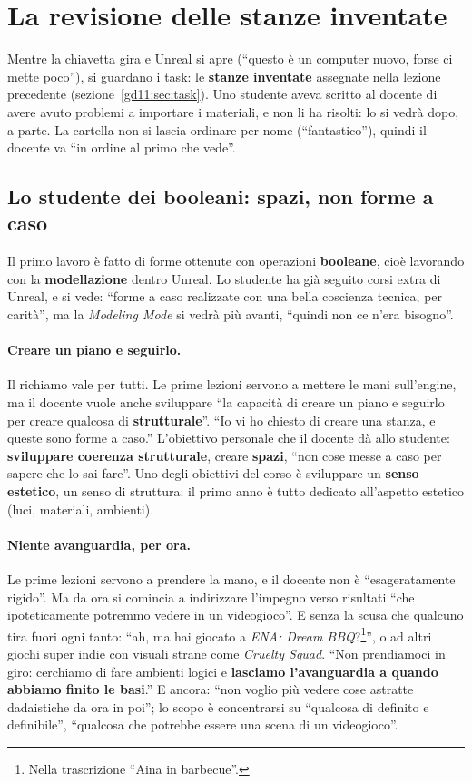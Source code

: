 \section{La revisione delle stanze inventate}
\label{gd14:sec:revisione}

Mentre la chiavetta gira e Unreal si apre (``questo è un computer nuovo, forse ci
mette poco''), si guardano i task: le \textbf{stanze inventate} assegnate nella
lezione precedente (sezione~\ref{gd11:sec:task}). Uno studente aveva scritto al
docente di avere avuto problemi a importare i materiali, e non li ha risolti: lo
si vedrà dopo, a parte. La cartella non si lascia ordinare per nome (``fantastico''),
quindi il docente va ``in ordine al primo che vede''.

\subsection{Lo studente dei booleani: spazi, non forme a caso}

Il primo lavoro è fatto di forme ottenute con operazioni \textbf{booleane}, cioè
lavorando con la \textbf{modellazione} dentro Unreal. Lo studente ha già seguito
corsi extra di Unreal, e si vede: ``forme a caso realizzate con una bella
coscienza tecnica, per carità'', ma la \emph{Modeling Mode} si vedrà più avanti,
``quindi non ce n'era bisogno''.

\paragraph{Creare un piano e seguirlo.} Il richiamo vale per tutti. Le prime
lezioni servono a mettere le mani sull'engine, ma il docente vuole anche
sviluppare ``la capacità di creare un piano e seguirlo per creare qualcosa di
\textbf{strutturale}''. ``Io vi ho chiesto di creare una stanza, e queste sono
forme a caso.'' L'obiettivo personale che il docente dà allo studente:
\textbf{sviluppare coerenza strutturale}, creare \textbf{spazi}, ``non cose messe a
caso per sapere che lo sai fare''. Uno degli obiettivi del corso è sviluppare un
\textbf{senso estetico}, un senso di struttura: il primo anno è tutto dedicato
all'aspetto estetico (luci, materiali, ambienti).

\paragraph{Niente avanguardia, per ora.} Le prime lezioni servono a prendere la
mano, e il docente non è ``esageratamente rigido''. Ma da ora si comincia a
indirizzare l'impegno verso risultati ``che ipoteticamente potremmo vedere in un
videogioco''. E senza la scusa che qualcuno tira fuori ogni tanto: ``ah, ma hai
giocato a \emph{ENA: Dream BBQ}?\footnote{Nella trascrizione ``Aina in
barbecue''.}'', o ad altri giochi super indie con visuali strane come
\emph{Cruelty Squad}. ``Non prendiamoci in giro: cerchiamo di fare ambienti logici
e \textbf{lasciamo l'avanguardia a quando abbiamo finito le basi}.'' E ancora: ``non
voglio più vedere cose astratte dadaistiche da ora in poi''; lo scopo è
concentrarsi su ``qualcosa di definito e definibile'', ``qualcosa che potrebbe
essere una scena di un videogioco''.

